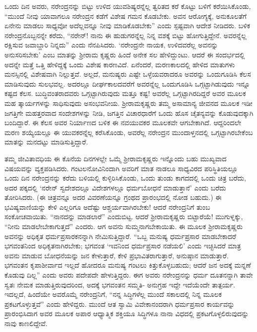 ಒಂದು ದಿನ ಅವರು, ನರೇಂದ್ರನನ್ನು ಬಿಟ್ಟು ಉಳಿದ ಯುವಶಿಷ್ಯರನ್ನೆಲ್ಲ ತ್ವರಿತದ ಕರೆ ಕೊಟ್ಟು ಬಳಿಗೆ ಕರೆಯಿಸಿಕೊಂಡು, “ಮುಂದೆ ನೀವು ಯಾವಾಗಲೂ ನರೇಂದ್ರನ ಕಡೆಗೆ ವಿಶೇಷ ಗಮನ ಕೊಡಬೇಕು. ಅವನ ಆರೋಗ್ಯಕ್ಕೆ, ಅನುಕೂಲತೆಗೆ ಏನೇನು ಮಾಡಲು ಸಾಧ್ಯವೋ ಅದೆಲ್ಲವನ್ನೂ ನೀವು ಮಾಡಿಕೊಡಬೇಕು” ಎಂದು ಸ್ಪಷ್ಟವಾಗಿ ಆದೇಶ ನೀಡಿದರು. ಬಳಿಕ ನರೇಂದ್ರನೊಬ್ಬನನ್ನೇ ಕರೆದು, “ನರೇನ್! ನಾನು ಈ ಹುಡುಗರನ್ನೆಲ್ಲ ನಿನ್ನ ವಶಕ್ಕೆ ಬಿಟ್ಟು ಹೋಗುತ್ತಿದ್ದೇನೆ. ಅವರನ್ನೆಲ್ಲ ರಕ್ಷಿಸುವ ಜವಾಬ್ದಾರಿ ನಿನ್ನದು” ಎಂದು ನೆನಪಿಸಿದರು. ‘ನರೇಂದ್ರನೇ ನಾಯಕ, ಉಳಿದವರೆಲ್ಲ ಅವನನ್ನು ಅನುಸರಿಸಬೇಕು’ ಎಂಬ ಮಾತನ್ನು ಶ್ರೀರಾಮ ಕೃಷ್ಣರು ಹಿಂದೆ ಅನೇಕ ಸಲ ಹೇಳಿದ್ದುಂಟು. ಆದರೆ ಈ ಸಂದರ್ಭದಲ್ಲಿ ಅದನ್ನೇ ಮತ್ತೆ ಒತ್ತಿ ಹೇಳಿದ್ದಕ್ಕೆ ಒಂದು ವಿಶೇಷ ಕಾರಣವಿದೆ. ಏನೆಂದರೆ, ಮರಣಕಾಲದಲ್ಲಿ ಹೇಳಿದ ಮಾತುಗಳು ಮನಸ್ಸಿನಲ್ಲಿ ವಿಶೇಷವಾಗಿ ನಿಲ್ಲುತ್ತವೆ. ಅಲ್ಲದೆ, ಮನುಷ್ಯರು ಎಷ್ಟೇ ಒಳ್ಳೆಯವರಾದರೂ ಅವರನ್ನು ಒಂದುಗೂಡಿಸಿ ಕೆಲಸ ಮಾಡಿಸುವುದು ಸುಲಭವಲ್ಲ. ಅದರಲ್ಲೂ ದೀರ್ಘಕಾಲದವರೆಗೆ ಅವರನ್ನೆಲ್ಲ ಒಂದುಗೂಡಿಸಿ ಒಗ್ಗಟ್ಟಾಗಿಡುವುದು ಇನ್ನೂ ಕಷ್ಟದ ಕೆಲಸ. ಬುದ್ಧಿವಂತರಾದವರು ಒಗ್ಗಟ್ಟಾಗಿರುವುದು ಮತ್ತೂ ಕಷ್ಟ! ಅವರೆಲ್ಲ ಒಗ್ಗಟ್ಟಾಗಿರದಿದ್ದರೆ ಅವರ ಮೂಲಕ ಮಹ ತ್ಕಾರ್ಯಗಳನ್ನು ಸಾಧಿಸುವುದು ಅಸಂಭವನೀಯ. ಶ್ರೀರಾಮಕೃಷ್ಣರು ತಮ್ಮ ಅಸಾಮಾನ್ಯ ಜೀವನದ ಮೂಲಕ ಇಡೀ ಜಗತ್ತಿಗೇ ಮಹತ್ತರವಾದ ಸಂದೇಶಗಳನ್ನು ನೀಡಿ, ಜಗತ್ತಿನ ವಿಚಾರಧಾರೆಗೆ ಒಂದು ಹೊಸ ಚೈತನ್ಯವನ್ನು ಕೊಡುವುದಕ್ಕಾಗಿ ಬಂದಿದ್ದಾರೆ. ಈ ಕೆಲಸ ಅವರ ನಿರ್ಯಾಣದ ಬಳಿಕ ಈ ನವಯುವಕರ ಮೂಲಕವೇ ಆಗಬೇಕಾಗಿದೆ. ಆದ್ದರಿಂದಲೇ ಮರಣ ಶಯ್ಯೆಯಲ್ಲೂ ಈ ಯುವಕರನ್ನೆಲ್ಲ ಕರೆಸಿಕೊಂಡು, ಅವರೆಲ್ಲ ನರೇಂದ್ರನ ಮುಂದಾಳ್ತನದಲ್ಲಿ ಒಗ್ಗಟ್ಟಾಗಿರಬೇಕೆಂಬ ಮಾತನ್ನು ಮನದಟ್ಟು ಮಾಡಿಸುತ್ತಿದ್ದಾರೆ.

ತಮ್ಮ ಜೀವಿತಾವಧಿಯ ಈ ಕೊನೆಯ ದಿನಗಳಲ್ಲೇ ಒಮ್ಮೆ ಶ್ರೀರಾಮಕೃಷ್ಣರು ಇನ್ನೊಂದು ಬಹು ಮುಖ್ಯವಾದ ವಿಷಯವನ್ನು ವ್ಯಕ್ತಪಡಿಸಿದರು. ಗಂಟಲನೋವಿನಿಂದಾಗಿ ಅವರಿಗೆ ಮಾತ ನಾಡಲೂ ಸಾಧ್ಯವಿರದ ಪರಿಸ್ಥಿತಿಯಲ್ಲೂ ಒಂದು ದಿನ ನರೇಂದ್ರನನ್ನು ಕರೆದು ಬಳಿಯಲ್ಲಿ ಕುಳ್ಳಿರಿಸಿಕೊಂಡು, ಒಂದು ತುಂಡು ಕಾಗದದಲ್ಲಿ ಒಂದು ಚಿತ್ರ ಬರೆದು, ಅದರ ಪಕ್ಕದಲ್ಲಿ ‘ನರೇನ್ ಸ್ವದೇಶದಲ್ಲೂ ವಿದೇಶಗಳಲ್ಲೂ ಧರ್ಮಬೋಧನೆ ಮಾಡುತ್ತಾನೆ’ ಎಂದು ಬರೆದು ತೋರಿಸಿದರು. (ಈ ಚಿತ್ರವನ್ನೂ ಅದರ ವಿವರಣೆಯನ್ನೂ ಗ್ರಂಥದ ಪ್ರಾರಂಭದಲ್ಲಿ ನೋಡ ಬಹುದು.) ಈ ಭವಿಷ್ಯವಾಣಿಯನ್ನು ಕೇಳಿ ಎಲ್ಲರಿಗೂ ಅದೆಷ್ಟು ಆಶ್ಚರ್ಯವಾಗಿರಬೇಕು! ಆದರೆ ನರೇಂದ್ರನಿಗೆ ತುಂಬ ಸಂಕೋಚವಾಯಿತು. “ನಾನದನ್ನು ಮಾಡಲಾರೆ” ಎಂದುಬಿಟ್ಟ. ಆದರೆ ಶ್ರೀರಾಮಕೃಷ್ಣರು ಬಿಟ್ಟಾರೆಯೆ! ಮುಗುಳ್ನಕ್ಕು, “ನೀನು ಮಾಡಲೇಬೇಕಾಗುತ್ತದೆ” ಎಂದರು. ಆಗ ಅವನು ಸುಮ್ಮನಾಗಬೇಕಾಯಿತು. ಈ ಮೂಲಕ ಶ್ರೀರಾಮಕೃಷ್ಣರು ಅವನನ್ನು ಅಧಿಕೃತ ಧರ್ಮಪ್ರಸಾರಕನನ್ನಾಗಿ ನೇಮಿಸುತ್ತಿದ್ದಾರೆ. “ಒಬ್ಬ ಮನುಷ್ಯ ಧರ್ಮಪ್ರಸಾರ ಮಾಡಬೇಕಾದರೆ ಭಗವಂತನಿಂದ ಅಧಿಕೃತನಾಗಿರಬೇಕು; ಭಗವಂತ ‘ಇವನಿಂದ ಧರ್ಮಪ್ರಸಾರ ನಡೆಯಲಿ’ ಎಂದು ಇಚ್ಛಿಸಿದರೆ ಮಾತ್ರ ಅವನು ಮಾಡುವ ಬೋಧನೆಯನ್ನು ಜನ ಕೇಳುತ್ತಾರೆ, ಕೇಳಿ ಪ್ರಭಾವಿತರಾಗುತ್ತಾರೆ, ಅನುಷ್ಠಾನ ಮಾಡುತ್ತಾರೆ. ಭಗವಂತನ ಕೃಪಾಶೀರ್ವಾದ ಇಲ್ಲದೆ ಹೋದರೂ ಮನುಷ್ಯ ಗಂಟಲು ಕಿತ್ತುಕೊಳ್ಳಬಹುದು; ಆದರೆ ಜನ ಅದಕ್ಕೆ ಮನ್ನಣೆ ಕೊಡುವು ದಿಲ್ಲ” ಎಂದು ಅವರು ಪದೇಪದೇ ಹೇಳುತ್ತಿದ್ದರು. ಈಗ ಅವರು ನರೇಂದ್ರನನ್ನು ಧರ್ಮ ದೂತನನ್ನಾಗಿ ತಾವೇ ಸ್ವತಃ ನೇಮಕ ಮಾಡುತ್ತಿರುವುದರಿಂದ, ಅದಕ್ಕೆ ಭಗವಂತನ ಸಮ್ಮತಿ- ಅನುಗ್ರಹ ಇದ್ದೇ ಇದೆಯೆಂದೇ ತಾತ್ಪರ್ಯ. ಇದಲ್ಲದೆ, ಹಿಂದೆಯೇ ಅವರೊಮ್ಮೆ ನರೇಂದ್ರನಿಗೆ, “ನನ್ನ ಸಿದ್ಧಿಗಳೆಲ್ಲ ಮುಂದೆ ಸಕಾಲದಲ್ಲಿ ನಿನ್ನ ಮೂಲಕ ಪ್ರಕಟಗೊಳ್ಳುತ್ತವೆ” ಎಂದು ಹೇಳಿದ್ದರು. ಮುಂದೆ ಆತ ಸ್ವಾಮಿ ವಿವೇಕಾನಂದರಾಗಿ ಧರ್ಮಪ್ರಸಾರ ಕಾರ್ಯವನ್ನು ಪ್ರಾರಂಭಿಸಿದಾಗ ಅವರ ಮೂಲಕ ಅಪಾರ ಆಧ್ಯಾತ್ಮಿಕ ಶಕ್ತಿಯೂ ಸಿದ್ಧಿಗಳೂ ನಾನಾ ವಿಧದಲ್ಲಿ ಪ್ರಕಟಗೊಳ್ಳಲಿರುವುದನ್ನು ನಾವು ಕಾಣಲಿದ್ದೇವೆ.

